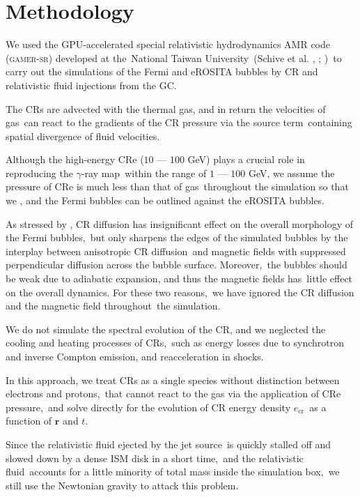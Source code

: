 \documentclass[twocolumn]{aastex631}
\begin{document}
\section{Methodology}

  We used the GPU-accelerated special relativistic hydrodynamics AMR code (\textsc{gamer-sr}) developed at the\
  National Taiwan University\
  (Schive et al. \citeyear{gamer-1}, \citeyear{gamer-2}; \citeauthor{tseng2021} \citeyear{tseng2021})\
  to carry out the simulations of the Fermi and eROSITA bubbles by CR and relativistic fluid injections from the GC.

  The CRs are advected with the thermal gas, and in return the velocities of gas\
  can react to the gradients of the CR pressure via the source term\
  containing spatial divergence of fluid velocities.\

  Although the high-energy CRe ($10$ --- $100$ GeV) plays a crucial role in reproducing the $\gamma$-ray map\
  within the range of $1$ --- $100$ GeV, we assume the pressure of CRe is much less than that of gas\
  throughout the simulation so that we , and the Fermi bubbles can be outlined against the eROSITA bubbles.

  As stressed by \citet{Yang2012}, CR diffusion has insignificant effect on the overall morphology of the Fermi bubbles,\
  but only sharpens the edges of the simulated bubbles by the interplay between anisotropic CR diffusion\
  and magnetic fields with suppressed perpendicular diffusion across the bubble surface. Moreover,\
  the bubbles should be weak due to adiabatic expansion, and thus the magnetic fields has\
  little effect on the overall dynamics. For these two reasons,\
  we have ignored the CR diffusion and the magnetic field throughout\
  the simulation.

  We do not simulate the spectral evolution of the CR, and we neglected the cooling and heating processes of CRs,\
  such as energy losses due to synchrotron and inverse Compton emission, and reacceleration in shocks.\

  In this approach, we treat CRs as a single species without distinction between electrons and protons,\
  that cannot react to the gas via the application of CRe pressure,\
  and solve directly for the evolution of CR energy density $e_{\text{cr}}$\
  as a function of $\mathbf{r}$ and $t$.\

  Since the relativistic fluid ejected by the jet source\
  is quickly stalled off and slowed down by a dense ISM disk in a short time,\
  and the relativistic fluid\
  accounts for a little minority of total mass inside the simulation box,\
  we still use the Newtonian gravity to attack this problem.
\end{document}
